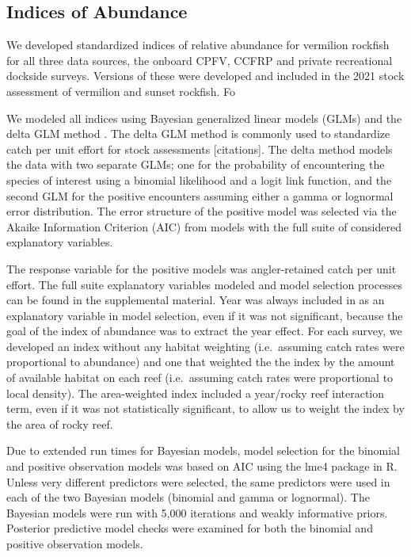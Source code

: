 \documentclass[
  12pt,
  authoryear,
  preprint,
  3p]{elsarticle}
\begin{document}
\hypertarget{indices-of-abundance}{%
\subsection{Indices of Abundance}\label{indices-of-abundance}}

We developed standardized indices of relative abundance for vermilion
rockfish for all three data sources, the onboard CPFV, CCFRP and private
recreational dockside surveys. Versions of these were developed and
included in the 2021 stock assessment of vermilion and sunset rockfish.
Fo

We modeled all indices using Bayesian generalized linear models (GLMs)
and the delta GLM method \citep{Lo:1992:IRA, Stefansson:1996:AGS}. The
delta GLM method is commonly used to standardize catch per unit effort
for stock assessments {[}citations{]}. The delta method models the data
with two separate GLMs; one for the probability of encountering the
species of interest using a binomial likelihood and a logit link
function, and the second GLM for the positive encounters assuming either
a gamma or lognormal error distribution. The error structure of the
positive model was selected via the Akaike Information Criterion (AIC)
from models with the full suite of considered explanatory variables.

The response variable for the positive models was angler-retained catch
per unit effort. The full suite explanatory variables modeled and model
selection processes can be found in the supplemental material. Year was
always included in as an explanatory variable in model selection, even
if it was not significant, because the goal of the index of abundance
was to extract the year effect. For each survey, we developed an index
without any habitat weighting (i.e.~assuming catch rates were
proportional to abundance) and one that weighted the the index by the
amount of available habitat on each reef (i.e.~assuming catch rates were
proportional to local density). The area-weighted index included a
year/rocky reef interaction term, even if it was not statistically
significant, to allow us to weight the index by the area of rocky reef.

Due to extended run times for Bayesian models, model selection for the
binomial and positive observation models was based on AIC using the lme4
package in R. Unless very different predictors were selected, the same
predictors were used in each of the two Bayesian models (binomial and
gamma or lognormal). The Bayesian models were run with 5,000 iterations
and weakly informative priors. Posterior predictive model checks were
examined for both the binomial and positive observation models.
\end{document}
